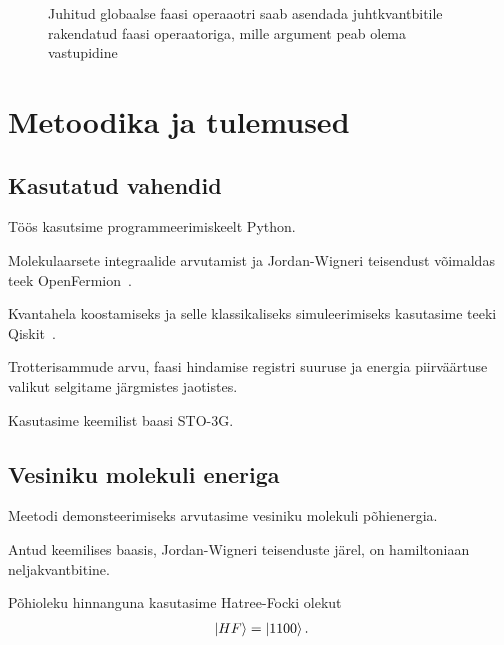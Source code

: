 \documentclass[12pt]{report}
\def\ket#1{\mathinner{|#1\rangle}}
\begin{document}
\begin{figure}[h]
    \centering
    \ifdefined\yquanton
    \fi
    \caption{Juhitud globaalse faasi operaaotri saab asendada juhtkvantbitile rakendatud faasi operaatoriga, mille argument peab olema vastupidine~\cite{nielsen+chuang}}
    \label{fig:globphase}
\end{figure}

\chapter{Metoodika ja tulemused}\label{chap:results}

\section{Kasutatud vahendid}

Töös kasutsime programmeerimiskeelt Python.

Molekulaarsete integraalide arvutamist ja Jordan-Wigneri teisendust võimaldas teek OpenFermion~\cite{openfermion}.

Kvantahela koostamiseks ja selle klassikaliseks simuleerimiseks kasutasime teeki Qiskit~\cite{qiskit}.

Trotterisammude arvu, faasi hindamise registri suuruse ja energia piirväärtuse valikut selgitame järgmistes jaotistes.

Kasutasime keemilist baasi STO-3G.

\section{Vesiniku molekuli eneriga}

Meetodi demonsteerimiseks arvutasime vesiniku molekuli põhienergia.

Antud keemilises baasis, Jordan-Wigneri teisenduste järel, on hamiltoniaan neljakvantbitine.

Põhioleku hinnanguna kasutasime Hatree-Focki olekut
\begin{align}
    \ket{HF} = \ket{1100} \rlap{.}
\end{align}
\end{document}
